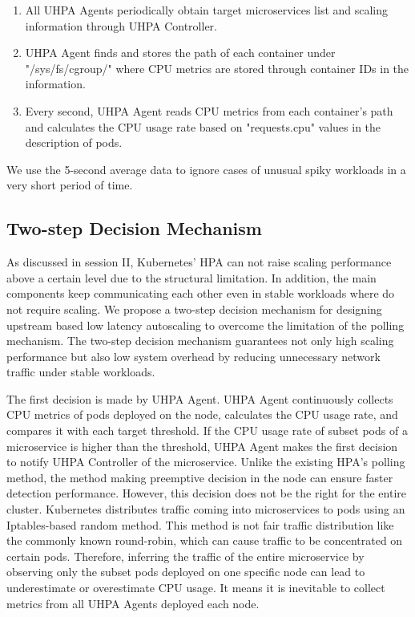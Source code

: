 \documentclass[conference]{IEEEtran}
\begin{document}
\begin{enumerate}
    \item All UHPA Agents periodically obtain target microservices list and scaling information  through UHPA Controller.

    \item UHPA Agent finds and stores the path of each container under "/sys/fs/cgroup/" where CPU metrics are stored through container IDs in the information.

    \item Every second, UHPA Agent reads CPU metrics from each container's path and calculates the CPU usage rate based on "requests.cpu" values in the description of pods.
\end{enumerate}

We use the 5-second average data to ignore cases of unusual spiky workloads in a very short period of time.


\subsection{Two-step Decision Mechanism}
As discussed in session II, Kubernetes' HPA can not raise scaling performance above a certain level due to the structural limitation. In addition, the main components keep communicating each other even in stable workloads where do not require scaling. We propose a two-step decision mechanism for designing upstream based low latency autoscaling to overcome the limitation of the polling mechanism. The two-step decision mechanism guarantees not only high scaling performance but also low system overhead by reducing unnecessary network traffic under stable workloads.

The first decision is made by UHPA Agent. UHPA Agent continuously collects CPU metrics of pods deployed on the node, calculates the CPU usage rate, and compares it with each target threshold. If the CPU usage rate of subset pods of a microservice is higher than the threshold, UHPA Agent makes the first decision to notify UHPA Controller of the microservice. Unlike the existing HPA's polling method, the method making preemptive decision in the node can ensure faster detection performance. However, this decision does not be the right for the entire cluster. Kubernetes distributes traffic coming into microservices to pods using an Iptables-based random method. This method is not fair traffic distribution like the commonly known round-robin, which can cause traffic to be concentrated on certain pods. Therefore, inferring the traffic of the entire microservice by observing only the subset pods deployed on one specific node can lead to underestimate or overestimate CPU usage. It means it is inevitable to collect metrics from all UHPA Agents deployed each node.
\end{document}
